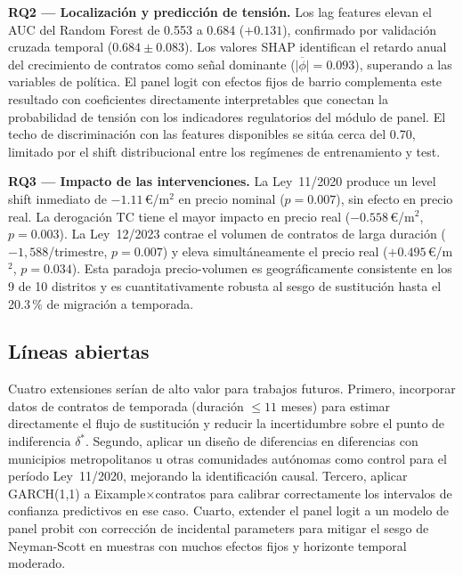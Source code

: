 \documentclass[10pt,a4paper,twocolumn]{article}
\begin{document}
\textbf{RQ2 — Localización y predicción de tensión.} Los lag features elevan el
AUC del Random Forest de 0.553 a 0.684 ($+0.131$), confirmado por validación
cruzada temporal ($0.684\pm0.083$). Los valores SHAP identifican el retardo anual
del crecimiento de contratos como señal dominante ($\overline{|\phi|}{=}0.093$),
superando a las variables de política. El panel logit con efectos fijos de barrio
complementa este resultado con coeficientes directamente interpretables que
conectan la probabilidad de tensión con los indicadores regulatorios del módulo
de panel. El techo de discriminación con las features disponibles se sitúa cerca
del 0.70, limitado por el shift distribucional entre los regímenes de entrenamiento
y test.

\textbf{RQ3 — Impacto de las intervenciones.} La Ley~11/2020 produce un level
shift inmediato de $-1.11$\,\euro/m$^2$ en precio nominal ($p{=}0.007$), sin
efecto en precio real. La derogación TC tiene el mayor impacto en precio real
($-0.558$\,\euro/m$^2$, $p{=}0.003$). La Ley~12/2023 contrae el volumen de
contratos de larga duración ($-1{,}588$/trimestre, $p{=}0.007$) y eleva
simultáneamente el precio real ($+0.495$\,\euro/m$^2$, $p{=}0.034$). Esta
paradoja precio-volumen es geográficamente consistente en los 9 de 10 distritos y
es cuantitativamente robusta al sesgo de sustitución hasta el 20.3\,\% de
migración a temporada.

\subsection{Líneas abiertas}

Cuatro extensiones serían de alto valor para trabajos futuros. Primero, incorporar
datos de contratos de temporada (duración $\leq 11$ meses) para estimar directamente
el flujo de sustitución y reducir la incertidumbre sobre el punto de indiferencia
$\delta^*$. Segundo, aplicar un diseño de diferencias en diferencias con municipios
metropolitanos u otras comunidades autónomas como control para el período Ley~11/2020, mejorando la identificación
causal. Tercero, aplicar GARCH(1,1) a Eixample$\times$contratos para calibrar
correctamente los intervalos de confianza predictivos en ese caso. Cuarto, extender
el panel logit a un modelo de panel probit con corrección de incidental parameters
para mitigar el sesgo de Neyman-Scott en muestras con muchos efectos fijos y horizonte
temporal moderado.
\end{document}
